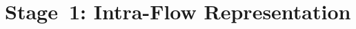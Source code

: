 \documentclass[11pt,fleqn]{report}
\begin{document}




\section{Stage~1: Intra-Flow Representation}
\label{subsec:results_stage1}
\end{document}
